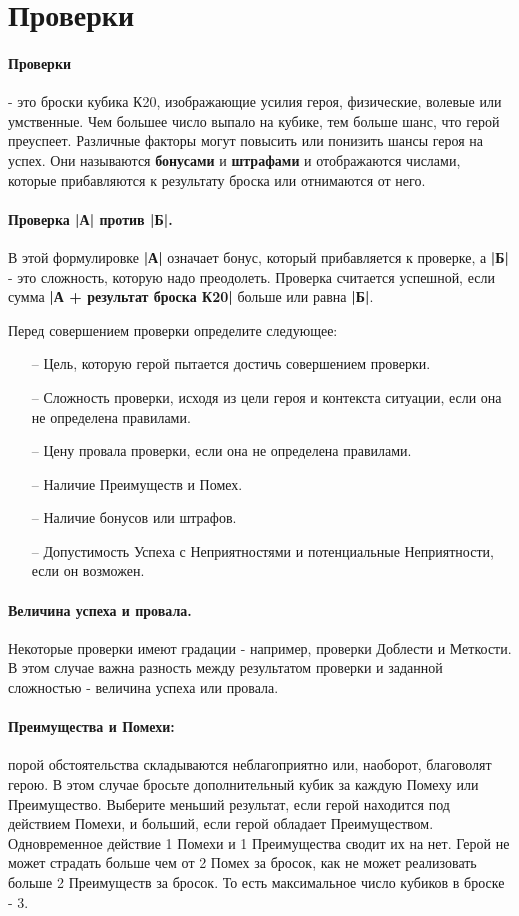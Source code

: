 \section{Проверки}
\paragraph{Проверки} - это броски кубика К20, изображающие усилия героя, физические, волевые или умственные. Чем большее число выпало на кубике, тем больше шанс, что герой преуспеет. Различные факторы могут повысить или понизить шансы героя на успех. Они называются \textbf{бонусами} и \textbf{штрафами} и отображаются числами, которые прибавляются к результату броска или отнимаются от него.
\paragraph{Проверка |А| против |Б|.} В этой формулировке \textbf{|А|} означает бонус, который прибавляется к проверке, а \textbf{|Б|} - это сложность, которую надо преодолеть. Проверка считается успешной, если сумма \textbf{|А + результат броска К20|} больше или равна \textbf{|Б|}.

Перед совершением проверки определите следующее:
\begin{itemize}
\item[--]Цель, которую герой пытается достичь совершением проверки.
\item[--]Сложность проверки, исходя из цели героя и контекста
ситуации, если она не определена правилами.
\item[--]Цену провала проверки, если она не определена правилами.
\item[--]Наличие Преимуществ и Помех.
\item[--]Наличие бонусов или штрафов.
\item[--]Допустимость Успеха с Неприятностями и потенциальные Неприятности, если он возможен.
\end{itemize}


\paragraph{Величина успеха и провала.} Некоторые проверки имеют градации - например, проверки Доблести и Меткости. В этом случае важна разность между результатом проверки и заданной сложностью - величина успеха или провала.

\paragraph{Преимущества и Помехи:} порой обстоятельства складываются неблагоприятно или, наоборот, благоволят герою. В этом случае бросьте дополнительный кубик за каждую Помеху или Преимущество. Выберите меньший результат, если герой находится под действием Помехи, и больший, если герой обладает Преимуществом. Одновременное действие 1 Помехи и 1 Преимущества сводит их на нет. 
\newline Герой не может страдать больше чем от 2 Помех за бросок, как не может реализовать больше 2 Преимуществ за бросок. То есть максимальное число кубиков в броске - 3.
